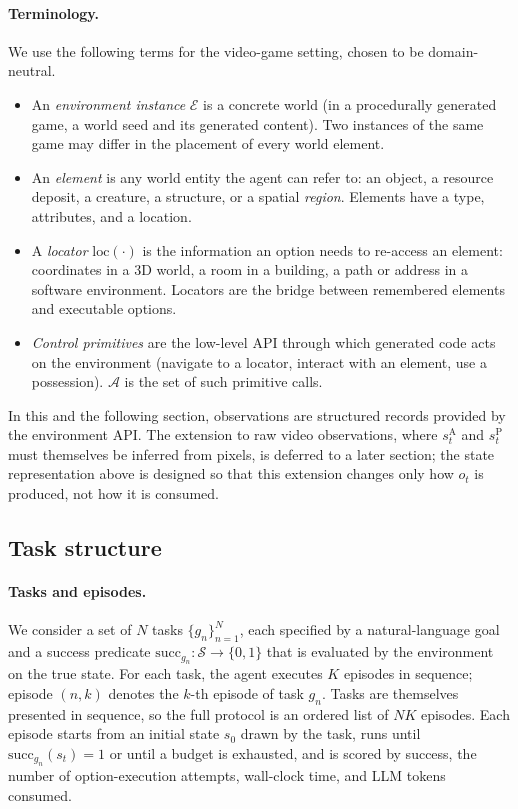 \documentclass[11pt]{article}
\newcommand{\calS}{\mathcal{S}}
\newcommand{\calA}{\mathcal{A}}
\newcommand{\calE}{\mathcal{E}}
\newcommand{\sA}{s^{\mathrm{A}}}
\newcommand{\sP}{s^{\mathrm{P}}}
\newcommand{\loc}{\mathrm{loc}}
\begin{document}
\paragraph{Terminology.}
We use the following terms for the video-game setting, chosen to be domain-neutral.
\begin{itemize}[leftmargin=1.5em,itemsep=1pt]
\item An \emph{environment instance} $\calE$ is a concrete world (in a procedurally generated game, a world seed and its generated content). Two instances of the same game may differ in the placement of every world element.
\item An \emph{element} is any world entity the agent can refer to: an object, a resource deposit, a creature, a structure, or a spatial \emph{region}. Elements have a type, attributes, and a location.
\item A \emph{locator} $\loc(\cdot)$ is the information an option needs to re-access an element: coordinates in a 3D world, a room in a building, a path or address in a software environment. Locators are the bridge between remembered elements and executable options.
\item \emph{Control primitives} are the low-level API through which generated code acts on the environment (navigate to a locator, interact with an element, use a possession). $\calA$ is the set of such primitive calls.
\end{itemize}
In this and the following section, observations are structured records provided by the environment API. The extension to raw video observations, where $\sA_t$ and $\sP_t$ must themselves be inferred from pixels, is deferred to a later section; the state representation above is designed so that this extension changes only how $o_t$ is produced, not how it is consumed.

\subsection{Task structure}
\label{sec:tasks}

\paragraph{Tasks and episodes.}
We consider a set of $N$ tasks $\{g_n\}_{n=1}^N$, each specified by a natural-language goal and a success predicate $\mathrm{succ}_{g_n}:\calS\to\{0,1\}$ that is evaluated by the environment on the true state. For each task, the agent executes $K$ episodes in sequence; episode $(n,k)$ denotes the $k$-th episode of task $g_n$. Tasks are themselves presented in sequence, so the full protocol is an ordered list of $NK$ episodes. Each episode starts from an initial state $s_0$ drawn by the task, runs until $\mathrm{succ}_{g_n}(s_t)=1$ or until a budget is exhausted, and is scored by success, the number of option-execution attempts, wall-clock time, and LLM tokens consumed.
\end{document}
